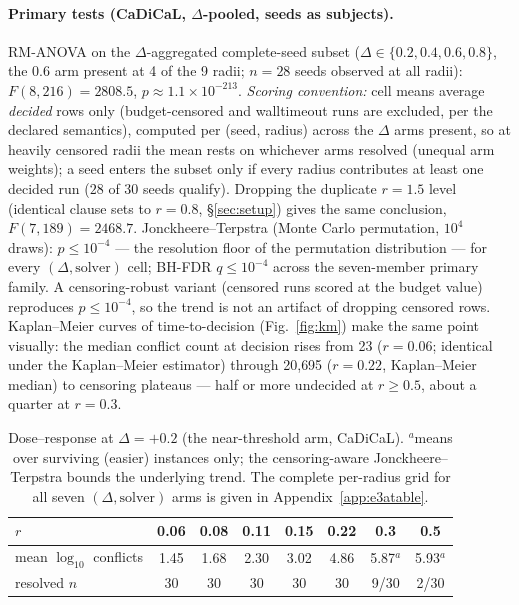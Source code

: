 \documentclass[pdflatex,sn-basic,Numbered]{sn-jnl}
\begin{document}
\paragraph{Primary tests (CaDiCaL, $\Delta$-pooled, seeds as subjects).}
RM-ANOVA on the $\Delta$-aggregated complete-seed subset ($\Delta\in\{0.2,
0.4,0.6,0.8\}$, the $0.6$ arm present at 4 of the 9 radii; $n=28$ seeds
observed at all radii): $F(8,216)=2808.5$, $p\approx1.1\times10^{-213}$.
\emph{Scoring convention:} cell means average \emph{decided} rows only
(budget-censored and walltimeout runs are excluded, per the declared
semantics), computed per (seed, radius) across the $\Delta$ arms present, so
at heavily censored radii the mean rests on whichever arms resolved
(unequal arm weights); a seed enters the subset only if every radius
contributes at least one decided run ($28$ of $30$ seeds qualify).
Dropping the duplicate $r{=}1.5$ level (identical clause sets to $r{=}0.8$,
\S\ref{sec:setup}) gives the same conclusion,
$F(7,189)=2468.7$. Jonckheere--Terpstra (Monte Carlo permutation, $10^4$
draws): $p\le10^{-4}$
--- the resolution floor of the permutation distribution --- for every
$(\Delta, \text{solver})$ cell; BH-FDR $q \le 10^{-4}$ across the seven-member
primary family. A censoring-robust variant (censored runs scored at the
budget value) reproduces $p\le10^{-4}$, so the trend is not an artifact of
dropping censored rows. Kaplan--Meier curves of time-to-decision
(Fig.~\ref{fig:km}) make the same point visually: the median conflict count at
decision rises from 23 ($r=0.06$; identical under the Kaplan--Meier
estimator) through 20{,}695 ($r=0.22$, Kaplan--Meier median) to censoring
plateaus --- half or more undecided at $r\ge0.5$, about a quarter at $r=0.3$.

\begin{table}[h]
\centering
\caption{Dose--response at $\Delta=+0.2$ (the near-threshold arm, CaDiCaL).
$^{a}$means over surviving (easier) instances only; the censoring-aware
Jonckheere--Terpstra bounds the underlying trend. The complete per-radius
grid for all seven $(\Delta, \text{solver})$ arms is given in
Appendix~\ref{app:e3atable}.}
\begin{tabular}{lccccccc}
\toprule
$r$ & 0.06 & 0.08 & 0.11 & 0.15 & 0.22 & 0.3 & 0.5\\
\midrule
mean $\log_{10}$ conflicts & 1.45 & 1.68 & 2.30 & 3.02 & 4.86 & 5.87$^{a}$ & 5.93$^{a}$\\
resolved $n$ & 30 & 30 & 30 & 30 & 30 & 9/30 & 2/30\\
\bottomrule
\end{tabular}

\label{tab:dose}
\end{table}
\end{document}
